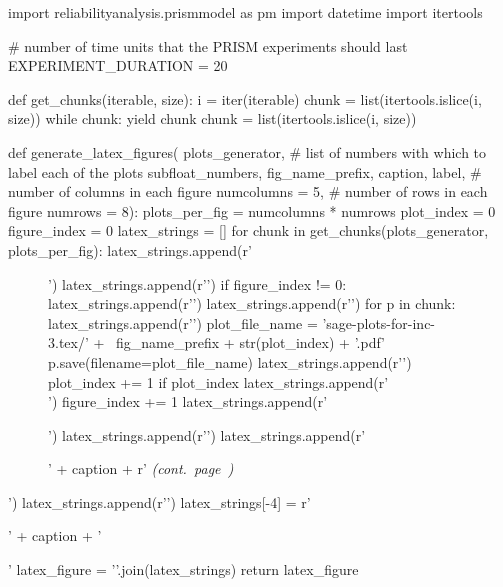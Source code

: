 \documentclass[times,a4paper,10pt,twocolumn]{article}
\theoremstyle{definition}
\theoremstyle{definition}
\theoremstyle{plain}
\begin{document}
\begin{sagesilent}
import reliabilityanalysis.prismmodel as pm
import datetime
import itertools

# number of time units that the PRISM experiments should last
EXPERIMENT_DURATION = 20

def get_chunks(iterable, size):
    i = iter(iterable)
    chunk = list(itertools.islice(i, size))
    while chunk:
        yield chunk
        chunk = list(itertools.islice(i, size))

def generate_latex_figures(
        plots_generator,
        # list of numbers with which to label each of the plots
        subfloat_numbers,
        fig_name_prefix,
        caption,
        label,
        # number of columns in each figure
        numcolumns = 5,
        # number of rows in each figure
        numrows = 8):
    plots_per_fig = numcolumns * numrows
    plot_index = 0
    figure_index = 0
    latex_strings = []
    for chunk in get_chunks(plots_generator, plots_per_fig):
        latex_strings.append(r'\begin{figure*}')
        latex_strings.append(r'\renewcommand*\thesubfigure{\arabic{subfigure}}')
        if figure_index != 0:
            latex_strings.append(r'\ContinuedFloat')
        latex_strings.append(r'\centering')
        for p in chunk:
            latex_strings.append(r'\setcounter{subfigure}{'+
                str(subfloat_numbers[plot_index] - 1) + '}')
            plot_file_name = 'sage-plots-for-inc-3.tex/' + \
                fig_name_prefix + str(plot_index) + '.pdf'
            p.save(filename=plot_file_name)
            latex_strings.append(r'\subfloat[]{\texttt{[image: ' +
                plot\_file\_name + ']}}')
            plot_index += 1
            if plot_index %
                latex_strings.append(r'\\')
        figure_index += 1
        latex_strings.append(r'\caption{' + caption +
            r' \emph{(cont.~page~\pageref{' +
            label + str(figure_index + 1) + r'})}}')
        latex_strings.append(r'\label{' + label + str(figure_index) + '}')
        latex_strings.append(r'\end{figure*}')
        latex_strings.append(r'\clearpage')
    latex_strings[-4] = r'\caption{' + caption + '}'
    latex_figure = '\n'.join(latex_strings)
    return latex_figure


\end{sagesilent}
\end{document}
